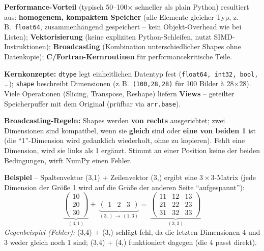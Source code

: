 \textbf{Performance-Vorteil} (typisch 50--100$\times$ schneller als plain Python) resultiert aus: \textbf{homogenem, kompaktem Speicher} (alle Elemente gleicher Typ, z.\,B.\ \texttt{float64}, zusammenhängend gespeichert -- kein Objekt-Overhead wie bei Listen); \textbf{Vektorisierung} (keine expliziten Python-Schleifen, nutzt SIMD-Instruktionen); \textbf{Broadcasting} (Kombination unterschiedlicher Shapes ohne Datenkopie); \textbf{C/Fortran-Kernroutinen} für performancekritische Teile.

\textbf{Kernkonzepte:} \texttt{dtype} legt einheitlichen Datentyp fest (\texttt{float64, int32, bool,} \ldots); \texttt{shape} beschreibt Dimensionen (z.\,B.\ \texttt{(100,28,28)} für 100 Bilder à 28$\times$28). Viele Operationen (Slicing, Transpose, Reshape) liefern \textbf{Views} -- geteilter Speicherpuffer mit dem Original (prüfbar via \texttt{arr.base}).

\textbf{Broadcasting-Regeln:} Shapes werden \textbf{von rechts} ausgerichtet; zwei Dimensionen sind kompatibel, wenn sie \textbf{gleich} sind oder \textbf{eine von beiden 1} ist (die ``1''-Dimension wird gedanklich wiederholt, ohne zu kopieren). Fehlt eine Dimension, wird sie links als 1 ergänzt. Stimmt an einer Position keine der beiden Bedingungen, wirft NumPy einen Fehler.

\textbf{Beispiel} -- Spaltenvektor (3,1) + Zeilenvektor (3,) ergibt eine $3\times3$-Matrix (jede Dimension der Größe 1 wird auf die Größe der anderen Seite ``aufgespannt''):
\[
\underbrace{\begin{pmatrix}10\\20\\30\end{pmatrix}}_{(3,1)} +\ \underbrace{\begin{pmatrix}1 & 2 & 3\end{pmatrix}}_{(3,)\,\to\,(1,3)} =\ \underbrace{\begin{pmatrix}11 & 12 & 13\\21 & 22 & 23\\31 & 32 & 33\end{pmatrix}}_{(3,3)}
\]
\textit{Gegenbeispiel (Fehler):} (3,4) + (3,) schlägt fehl, da die letzten Dimensionen $4$ und $3$ weder gleich noch $1$ sind; (3,4) + (4,) funktioniert dagegen (die 4 passt direkt).

